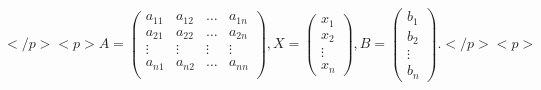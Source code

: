 \documentclass[12pt]{article}
\begin{document}
$ </p>
<p>\begin{equation*}A=\begin{pmatrix}a_{11} & a_{12} & \ldots & a_{1n} \\a_{21} & a_{22} & \ldots & a_{2n} \\\vdots & \vdots & \vdots & \vdots \\a_{n1} & a_{n2} & \ldots & a_{nn} \\\end{pmatrix}, X=\begin{pmatrix}x_1 \\x_2 \\\vdots \\x_n\end{pmatrix}, B = \begin{pmatrix}b_1 \\b_2 \\\vdots \\b_n\end{pmatrix}.\end{equation*}</p>
<p> $
\end{document}
